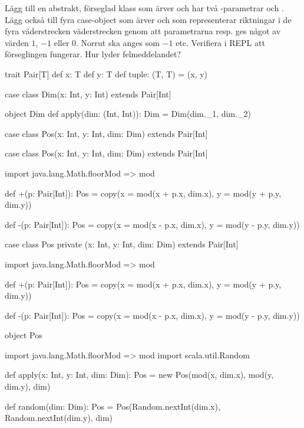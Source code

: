 \Subtask Lägg till en abstrakt, förseglad klass  som ärver  och har två -parametrar  och . Lägg också till fyra case-object som ärver  och som representerar riktningar i de fyra väderstrecken väderstrecken genom att parametrarna  resp.  ges något av värden $1$, $-1$ eller $0$. Norrut ska anges som $-1$ etc. Verifiera i REPL att förseglingen fungerar. Hur lyder felmeddelandet?


\SOLUTION


\TaskSolved \what

\SubtaskSolved
\begin{CodeSmall}
trait Pair[T] {
  def x: T
  def y: T
  def tuple: (T, T) = (x, y)
}
\end{CodeSmall}

\SubtaskSolved
\begin{CodeSmall}
case class Dim(x: Int, y: Int) extends Pair[Int]
\end{CodeSmall}

\SubtaskSolved
\begin{CodeSmall}
object Dim {
  def apply(dim: (Int, Int)): Dim = Dim(dim._1, dim._2)
}
\end{CodeSmall}

\SubtaskSolved
\begin{CodeSmall}
case class Pos(x: Int, y: Int, dim: Dim) extends Pair[Int]
\end{CodeSmall}

\SubtaskSolved
\begin{CodeSmall}
case class Pos(x: Int, y: Int, dim: Dim) extends Pair[Int] {
  import java.lang.Math.{floorMod => mod}

  def +(p: Pair[Int]): Pos =
    copy(x = mod(x + p.x, dim.x), y = mod(y + p.y, dim.y))

  def -(p: Pair[Int]): Pos =
    copy(x = mod(x - p.x, dim.x), y = mod(y - p.y, dim.y))
}
\end{CodeSmall}

\SubtaskSolved \SubtaskSolved
\begin{CodeSmall}
case class Pos private (x: Int, y: Int, dim: Dim) extends Pair[Int] {
  import java.lang.Math.{floorMod => mod}

  def +(p: Pair[Int]): Pos =
    copy(x = mod(x + p.x, dim.x), y = mod(y + p.y, dim.y))

  def -(p: Pair[Int]): Pos =
    copy(x = mod(x - p.x, dim.x), y = mod(y - p.y, dim.y))
}

object Pos {
  import java.lang.Math.{floorMod => mod}
  import scala.util.Random

  def apply(x: Int, y: Int, dim: Dim): Pos =
    new Pos(mod(x, dim.x), mod(y, dim.y), dim)

  def random(dim: Dim): Pos = {
    Pos(Random.nextInt(dim.x), Random.nextInt(dim.y), dim)
  }
}
\end{CodeSmall}


